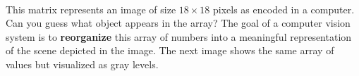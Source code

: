 \[\begin{array}{cc}
	\end{array}
\]

This matrix represents an image of size $18 \times 18$ pixels as encoded in a computer. Can you guess what object appears in the array?
The goal of a computer vision system is to {\bf reorganize} this array of numbers into a meaningful representation of the scene depicted in the image. The next image shows the same array of values but visualized as gray levels.






